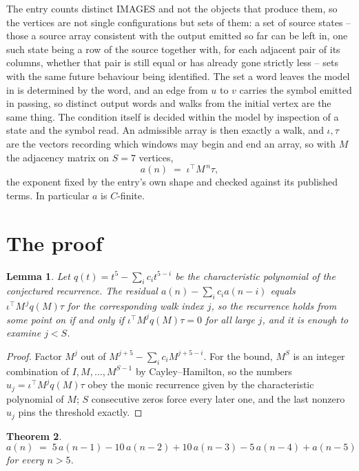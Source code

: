 \documentclass[11pt,a4paper]{article}
\theoremstyle{plain}
\newtheorem{theorem}{Theorem}
\newtheorem{lemma}[theorem]{Lemma}
\theoremstyle{definition}
\begin{document}
The entry counts distinct IMAGES and not the objects that produce them, so the vertices are not single configurations but sets of them: a set of source states -- those a source array consistent with the output emitted so far can be left in, one such state being a row of the source together with, for each adjacent pair of its columns, whether that pair is still equal or has already gone strictly less -- sets with the same future behaviour being identified. The set a word leaves the model in is determined by the word, and an edge from $u$ to $v$ carries the symbol emitted in passing, so distinct output words and walks from the initial vertex are the same thing. The condition itself is decided within the model by inspection of a state and the symbol read.
An admissible array is then exactly a walk, and $\iota,\tau$ are the vectors recording which windows may begin and end an array, so with $M$ the adjacency matrix on $S=7$ vertices,
\[
a(n)\;=\;\iota^{\!\top}M^{\,n}\tau ,
\]
the exponent fixed by the entry's own shape and checked against its published terms. In
particular $a$ is $C$-finite.

\section{The proof}

\begin{lemma}\label{lem:crit}
Let $q(t)=t^{5}-\sum_i c_it^{5-i}$ be the characteristic polynomial of the
conjectured recurrence. The residual $a(n)-\sum_ic_ia(n-i)$ equals
$\iota^{\!\top}M^{\,j}q(M)\tau$ for the corresponding walk index $j$, so the recurrence
holds from some point on if and only if $\iota^{\!\top}M^{j}q(M)\tau=0$ for all large $j$,
and it is enough to examine $j<S$.
\end{lemma}

\begin{proof}
Factor $M^{j}$ out of $M^{j+5}-\sum_ic_iM^{j+5-i}$. For the bound, $M^{S}$
is an integer combination of $I,M,\dots,M^{S-1}$ by Cayley--Hamilton, so the numbers
$u_j=\iota^{\!\top}M^{j}q(M)\tau$ obey the monic recurrence given by the characteristic
polynomial of $M$; $S$ consecutive zeros force every later one, and the last nonzero $u_j$
pins the threshold exactly.
\end{proof}

\begin{theorem}
\[
a(n)\;=\;5\,a(n-1) - 10\,a(n-2) + 10\,a(n-3) - 5\,a(n-4) + a(n-5)
\]
for every $n>5$.
\end{theorem}
\end{document}
